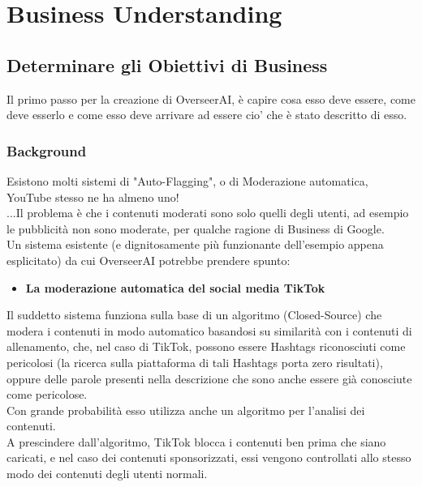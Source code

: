 \documentclass[a4paper,12pt]{report}
\begin{document}
\newpage

\begingroup%
\makeatletter%
\let\clearpage\relax%
\vspace*{\fill}%
\vspace*{\dimexpr-50\p@-\baselineskip}%
\chapter{Business Understanding}
\vspace*{\fill}%
\endgroup
\newpage

\section{Determinare gli Obiettivi di Business}
Il primo passo per la creazione di OverseerAI, è capire cosa esso deve essere, come deve esserlo e come esso deve arrivare ad essere cio' che è stato descritto di esso.
\subsection{Background}
Esistono molti sistemi di "Auto-Flagging", o di Moderazione automatica, YouTube stesso ne ha almeno uno!\\
...Il problema è che i contenuti moderati sono solo quelli degli utenti, ad esempio le pubblicità non sono moderate, per qualche ragione di Business di Google.\\
Un sistema esistente (e dignitosamente più funzionante dell'esempio appena esplicitato) da cui OverseerAI potrebbe prendere spunto:
\begin{itemize}
    \item \textbf{La moderazione automatica del social media TikTok} 
\end{itemize}
Il suddetto sistema funziona sulla base di un algoritmo (Closed-Source) che modera i contenuti in modo automatico basandosi su similarità con i contenuti di allenamento, che, nel caso di TikTok, possono essere Hashtags riconosciuti come pericolosi (la ricerca sulla piattaforma di tali Hashtags porta zero risultati), oppure delle parole presenti nella descrizione che sono anche essere già conosciute come pericolose.\\
Con grande probabilità esso utilizza anche un algoritmo per l'analisi dei contenuti.\\
A prescindere dall'algoritmo, TikTok blocca i contenuti ben prima che siano caricati, e nel caso dei contenuti sponsorizzati, essi vengono controllati allo stesso modo dei contenuti degli utenti normali.
\end{document}
